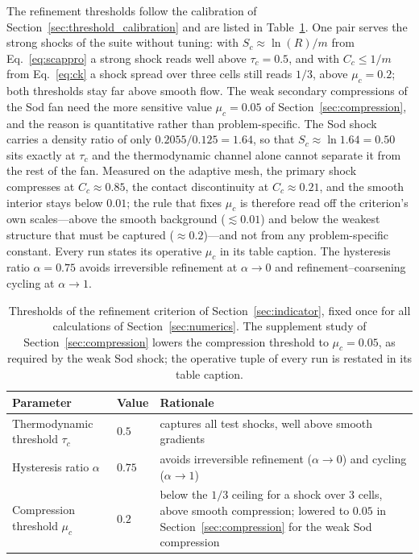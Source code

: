 \documentclass[a4paper]{cas-sc}
\begin{document}
The refinement thresholds follow the calibration of Section~\ref{sec:threshold_calibration} and are listed in Table~\ref{tab:amr_parameters}. One pair serves the strong shocks of the suite without tuning: with $S_c\approx \ln(R)/m$ from Eq.~\eqref{eq:scappro} a strong shock reads well above $\tau_c=0.5$, and with $C_c\le 1/m$ from Eq.~\eqref{eq:ck} a shock spread over three cells still reads $1/3$, above $\mu_c=0.2$; both thresholds stay far above smooth flow. The weak secondary compressions of the Sod fan need the more sensitive value $\mu_c=0.05$ of Section~\ref{sec:compression}, and the reason is quantitative rather than problem-specific. The Sod shock carries a density ratio of only $0.2055/0.125=1.64$, so that $S_c\approx\ln 1.64=0.50$ sits exactly at $\tau_c$ and the thermodynamic channel alone cannot separate it from the rest of the fan. Measured on the adaptive mesh, the primary shock compresses at $C_c\approx0.85$, the contact discontinuity at $C_c\approx0.21$, and the smooth interior stays below $0.01$; the rule that fixes $\mu_c$ is therefore read off the criterion's own scales---above the smooth background ($\lesssim0.01$) and below the weakest structure that must be captured ($\approx0.2$)---and not from any problem-specific constant. Every run states its operative $\mu_c$ in its table caption. The hysteresis ratio $\alpha=0.75$ avoids irreversible refinement at $\alpha\to0$ and refinement--coarsening cycling at $\alpha\to1$.

\begin{table}[pos=htbp]
	\centering
	\caption{Thresholds of the refinement criterion of Section~\ref{sec:indicator}, fixed once for all calculations of Section~\ref{sec:numerics}. The supplement study of Section~\ref{sec:compression} lowers the compression threshold to $\mu_c=0.05$, as required by the weak Sod shock; the operative tuple of every run is restated in its table caption.}
	\label{tab:amr_parameters}
	\begin{tabular}{lll}
		\hline
		Parameter & Value & Rationale \\
		\hline
		Thermodynamic threshold $\tau_c$ & $0.5$ & captures all test shocks, well above smooth gradients \\
		Hysteresis ratio $\alpha$ & $0.75$ & avoids irreversible refinement ($\alpha\to0$) and cycling ($\alpha\to1$) \\
		Compression threshold $\mu_c$ & $0.2$ & below the $1/3$ ceiling for a shock over $3$ cells, above smooth compression; lowered to $0.05$ in Section~\ref{sec:compression} for the weak Sod compression \\
		\hline
	\end{tabular}
\end{table}
\end{document}
